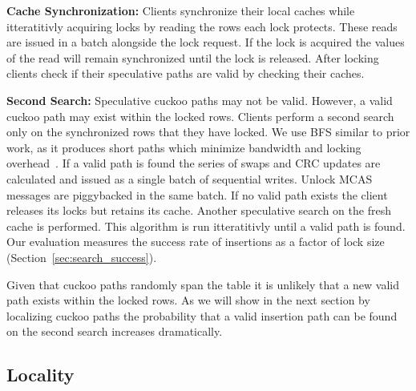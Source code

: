 
\textbf{Cache Synchronization:} Clients synchronize their
local caches while itteratitivly acquiring locks by reading
the rows each lock protects. These reads are issued in a
batch alongside the lock request. If the lock is acquired
the values of the read will remain synchronized until the
lock is released.  After locking clients check if their
speculative paths are valid by checking their caches.


\textbf{Second Search:} Speculative cuckoo paths may not be
valid. However, a valid cuckoo path may exist within the
locked rows. Clients perform a second search only on the
synchronized rows that they have locked. We use BFS similar
to prior work, as it produces short paths which minimize
bandwidth and locking overhead~\cite{cuckoo-improvements}.
If a valid path is found the series of swaps and CRC updates
are calculated and issued as a single batch of sequential
writes. Unlock MCAS messages are piggybacked in the same
batch.  If no valid path exists the client releases its
locks but retains its cache. Another speculative search on
the fresh cache is performed. This algorithm is run
itteratitivly until a valid path is found. Our evaluation
measures the success rate of insertions as a factor of lock
size (Section~\ref{sec:search_success}).


Given that cuckoo paths randomly span the table it is
unlikely that a new valid path exists within the locked
rows. As we will show in the next section by localizing
cuckoo paths the probability that a valid insertion path can
be found on the second search increases dramatically.




\subsection{Locality}

